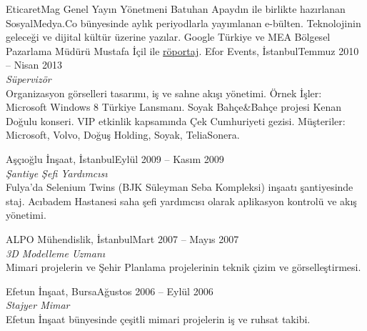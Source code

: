 \documentclass[8pt]{scrartcl}
\newenvironment{xplist}{%
  \setlist{nosep}
  \newcommand\xpitem[4]{%
    {\color{header}%
      \sc##2\hfill ##1}\\[2pt]
    {\Large\textit{##3}
      \smallskip} \\%
    {##4\bigskip}%

  }}%
{\setlist{}}
\begin{document}
\begin{xplist}
{{      EticaretMag Genel  Yayın Yönetmeni Batuhan Apaydın  ile birlikte
      hazırlanan   SosyalMedya.Co    bünyesinde   aylık   periyodlarla
      yayımlanan  e-bülten. Teknolojinin  geleceği  ve dijital  kültür
      üzerine yazılar. Google Türkiye ve MEA Bölgesel Pazarlama Müdürü
      Mustafa                         İçil                         ile
      \href{http://sosyalmedya.co/google-mustafa-icil/}{röportaj}.}%
    \xpitem%
    {Temmuz 2010 -- Nisan 2013}%
    {Efor Events, İstanbul}%
    {Süpervizör}{%
      Organizasyon görselleri  tasarımı, iş  ve sahne  akışı yönetimi.
      Örnek  İşler:  Microsoft  Windows  8  Türkiye  Lansmanı.   Soyak
      Bahçe\&Bahçe  projesi   Kenan  Doğulu  konseri.    VIP  etkinlik
      kapsamında  Çek  Cumhuriyeti   gezisi.   Müşteriler:  Microsoft,
      Volvo, Doğuş Holding, Soyak, TeliaSonera.}%
    \xpitem%
    {Eylül 2009 -- Kasım 2009}%
    {Aşçıoğlu İnşaat, İstanbul}%
    {Şantiye Şefi Yardımcısı}{%
      Fulya'da Selenium  Twins (BJK  Süleyman Seba  Kompleksi) inşaatı
      şantiyesinde  staj.   Acıbadem  Hastanesi saha  şefi  yardımcısı
      olarak aplikasyon kontrolü ve akış yönetimi.  }%
    \xpitem%
    {Mart 2007 -- Mayıs 2007}%
    {ALPO Mühendislik, İstanbul}%
    {3D Modelleme Uzmanı}{%
      Mimari projelerin ve Şehir Planlama projelerinin teknik çizim ve
      görselleştirmesi.  }%
    \xpitem%
    {Ağustos 2006 -- Eylül 2006}%
    {Efetun İnşaat, Bursa}%
    {Stajyer Mimar}{%
      Efetun İnşaat bünyesinde çeşitli  mimari projelerin iş ve ruhsat
      takibi.}}%
\end{xplist}
\end{document}
